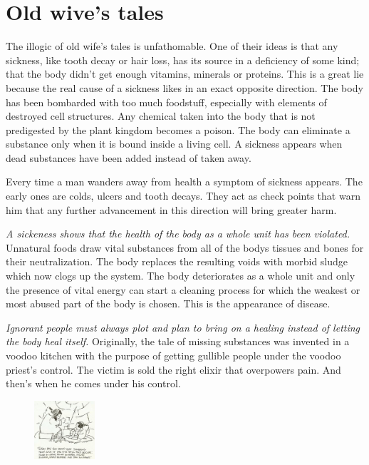 \documentclass[landscape,twocolumn,letterpaper]{article}
\begin{document}
\section{Old wive's tales}
\label{sec:owt}

The illogic of old wife's tales is unfathomable. One of their ideas is
that any sickness, like tooth decay or hair loss, has its source in a
deficiency of some kind; that the body didn't get enough vitamins,
minerals or proteins. This is a great lie because the real cause of a
sickness likes in an exact opposite direction. The body has been
bombarded with too much foodstuff, especially with elements of
destroyed cell structures. Any chemical taken into the body that is
not predigested by the plant kingdom becomes a poison. The body can
eliminate a substance only when it is bound inside a living cell. A
sickness appears when dead substances have been added instead of taken
away.

Every time a man wanders away from health a symptom of sickness
appears. The early ones are colds, ulcers and tooth decays. They act
as check points that warn him that any further advancement in this
direction will bring greater harm.

\emph{A sickeness shows that the health of the body as a whole unit has
been violated.} Unnatural foods draw vital substances from all of the
bodys tissues and bones for their neutralization. The body replaces the
resulting voids with morbid sludge which now clogs up the system. The
body deteriorates as a whole unit and only the presence of vital
energy can start a cleaning process for which the weakest or most
abused part of the body is chosen. This is the appearance of disease.

\emph{Ignorant people must always plot and plan to bring on a healing
instead of letting the body heal itself.} Originally, the tale of
missing substances was invented in a voodoo kitchen with the purpose
of getting gullible people under the voodoo priest's control. The
victim is sold the right elixir that overpowers pain. And then's when
he comes under his control.

\begin{figure}
  \includegraphics[width=0.2\textwidth,bb= 0 0 409 396]{p27.jpg}
\end{figure}
\end{document}
